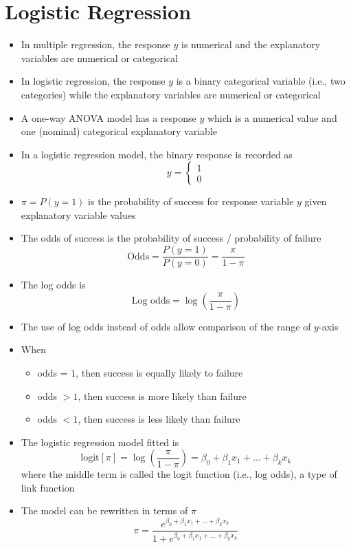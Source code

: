 \documentclass[12pt]{article}
\begin{document}
\section{Logistic Regression}
\begin{itemize}
\item In multiple regression, the response $y$ is numerical and the explanatory variables are numerical or categorical
\item In logistic regression, the response $y$ is a binary categorical variable (i.e., two categories) while the explanatory variables are numerical or categorical
\item A one-way ANOVA model has a response $y$ which is a numerical value and one (nominal) categorical explanatory variable
\item In a logistic regression model, the binary response is recorded as $$ y = \begin{cases} 1 \\ 0 \end{cases} $$ 
\item $\pi = P(y = 1)$ is the probability of success for response variable $y$ given explanatory variable values 
\item The odds of success is the probability of success / probability of failure 
$$ \text{Odds} = \frac{P(y = 1)}{P(y=0)} = \frac{\pi}{1-\pi} $$ 
\item The log odds is $$ \text{Log odds} = \log \left( \frac{\pi}{1-\pi} \right) $$ 
\item The use of log odds instead of odds allow comparison of the range of $y$-axis 
\item When \begin{itemize} 
\item odds = $1$, then success is equally likely to failure
\item odds $> 1$, then success is more likely than failure
\item odds $< 1$, then success is less likely than failure \end{itemize} 
\item The logistic regression model fitted is 
$$ \text{logit}[\pi] = \log \left( \frac{\pi}{1-\pi} \right) = \beta_0 + \beta_1x_1 + \dots + \beta_kx_k $$ where the middle term is called the logit function (i.e., log odds), a type of link function 
\item The model can be rewritten in terms of $\pi$ 
$$ \pi = \frac{e^{\beta_0 + \beta_1x_1 + \dots + \beta_kx_k}}{1 + e^{\beta_0 + \beta_1x_1 + \dots + \beta_kx_k}} $$ 

\end{itemize}
\end{document}
